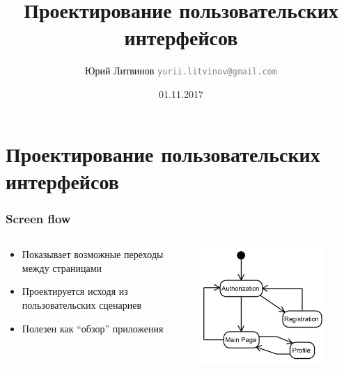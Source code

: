 \documentclass[xetex,mathserif,serif]{beamer}
\title{Проектирование пользовательских интерфейсов}
\author[Юрий Литвинов]{Юрий Литвинов \newline \textcolor{gray}{\small\texttt{yurii.litvinov@gmail.com}}}
\date{01.11.2017}
\begin{document}
	\frame{\titlepage}
	\section{Проектирование пользовательских интерфейсов}
	
		\begin{frame}
			\frametitle{Screen flow}
			\begin{columns}
				\begin{column}{0.6\textwidth}
					\begin{itemize}
						\item Показывает возможные переходы между страницами
						\item Проектируется исходя из пользовательских сценариев
						\item Полезен как ``обзор'' приложения
					\end{itemize}
				\end{column}
				\begin{column}{0.4\textwidth}
					\begin{center}
						\includegraphics[width=0.8\textwidth]{screenFlow.png}
					\end{center}
				\end{column}
			\end{columns}
		\end{frame}
	
\end{document}
